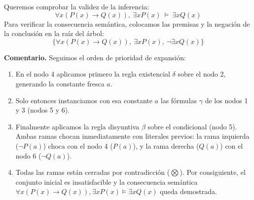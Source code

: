 \begin{ejemplo}
Queremos comprobar la validez de la inferencia:
\[
\forall x (P(x) \to Q(x)), \ \exists x P(x) \ \models \ \exists x Q(x)
\]
Para verificar la consecuencia semántica, colocamos las premisas y la negación de la conclusión en la raíz del árbol:
\[
\{\forall x (P(x) \to Q(x)), \ \exists x P(x), \ \neg \exists x Q(x)\}
\]

\begin{center}
\end{center}

\textbf{Comentario.} Seguimos el orden de prioridad de expansión:
\begin{enumerate}
    \item En el nodo 4 aplicamos primero la regla existencial $\delta$ sobre el nodo 2, generando la constante fresca $a$.
    \item Solo entonces instanciamos con esa constante $a$ las fórmulas $\gamma$ de los nodos 1 y 3 (nodos 5 y 6).
    \item Finalmente aplicamos la regla disyuntiva $\beta$ sobre el condicional (nodo 5). Ambas ramas chocan inmediatamente con literales previos: la rama izquierda ($\neg P(a)$) choca con el nodo 4 ($P(a)$), y la rama derecha ($Q(a)$) con el nodo 6 ($\neg Q(a)$).
    \item Todas las ramas están cerradas por contradicción ($\bigotimes$). Por consiguiente, el conjunto inicial es insatisfacible y la consecuencia semántica $\forall x (P(x) \to Q(x)), \exists x P(x) \models \exists x Q(x)$ queda demostrada.
\end{enumerate}
\end{ejemplo}

